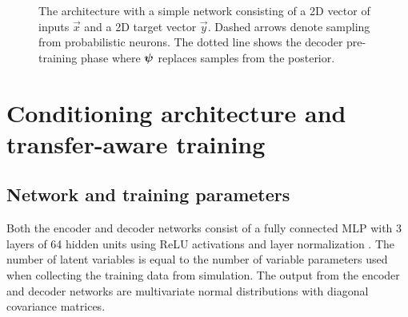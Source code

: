 \begin{figure}
\caption{The \dettostoc{} architecture with a simple network consisting of a 2D vector of inputs $\vec{x}$ and a 2D target vector $\vec{y}$. Dashed arrows denote sampling from probabilistic neurons. The dotted line shows the decoder pre-training phase where $\boldsymbol{\psi}$ replaces samples from the posterior.}
\label{fig:det2stoc_architecture}
\end{figure}

\section{Conditioning architecture and transfer-aware training}

\subsection{Network and training parameters}
Both the encoder and decoder networks consist of a fully connected MLP with 3 layers of 64 hidden units using ReLU activations and layer normalization \parencite{Ba2016}. The number of latent variables is equal to the number of variable parameters used when collecting the training data from simulation. The output from the encoder and decoder networks are multivariate normal distributions with diagonal covariance matrices.

